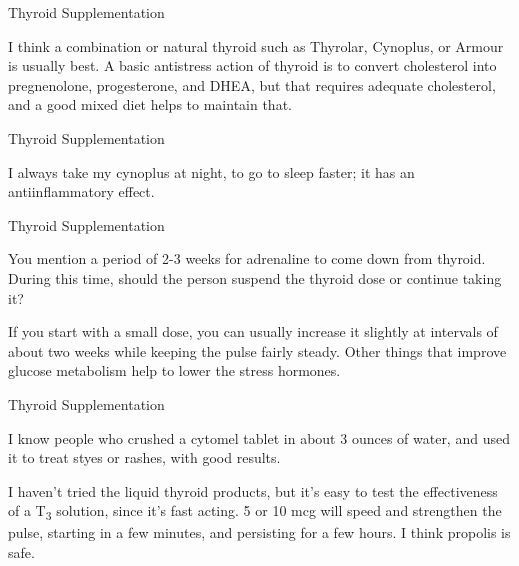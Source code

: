 \documentclass[11pt,oneside,openany,extrafontsizes]{memoir}
\begin{document}
\begin{standalonequote}{Thyroid Supplementation}

    \begin{answer}
      I think a combination or natural thyroid such as Thyrolar, Cynoplus, or Armour is usually best. A basic antistress action of thyroid is to convert cholesterol into pregnenolone, progesterone, and DHEA, but that requires adequate cholesterol, and a good mixed diet helps to maintain that.
    \end{answer}
\end{standalonequote}

\begin{standalonequote}{Thyroid Supplementation}

    \begin{answer}
      I always take my cynoplus at night, to go to sleep faster; it has an antiinflammatory effect.
    \end{answer}
\end{standalonequote}

\begin{qaexchange}{Thyroid Supplementation}

    \begin{question}
        You mention a period of 2-3 weeks for adrenaline to come down from thyroid. During this time, should the person suspend the thyroid dose or continue taking it?
    \end{question}

    \begin{answer}
      If you start with a small dose, you can usually increase it slightly at intervals of about two weeks while keeping the pulse fairly steady. Other things that improve glucose metabolism help to lower the stress hormones.
    \end{answer}
\end{qaexchange}

\begin{standalonequote}{Thyroid Supplementation}

    \begin{answer}
      I know people who crushed a cytomel tablet in about 3 ounces of water, and used it to treat styes or rashes, with good results.

      I haven't tried the liquid thyroid products, but it's easy to test the effectiveness of a T\textsubscript{3} solution, since it's fast acting. 5 or 10 mcg will speed and strengthen the pulse, starting in a few minutes, and persisting for a few hours. I think propolis is safe.
    \end{answer}
\end{standalonequote}
\end{document}
